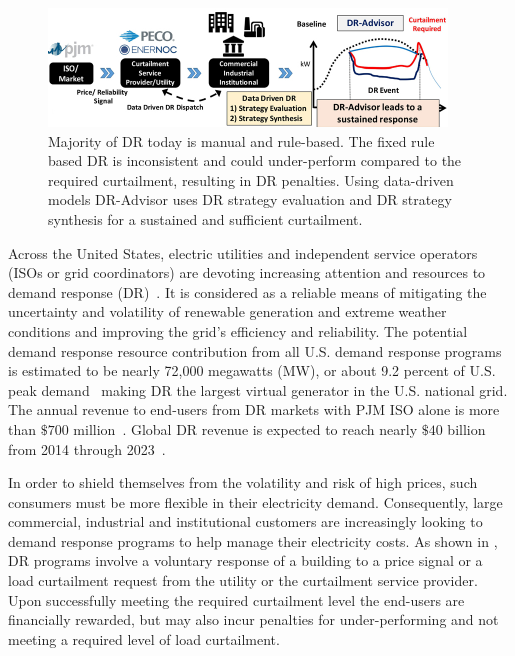\begin{figure}[t]
\centering
\includegraphics[width=0.9\columnwidth]{figs/demandresponse}
\caption{Majority of DR today is manual and rule-based. The fixed rule based DR is inconsistent and could under-perform compared to the required curtailment, resulting in DR penalties. Using data-driven models DR-Advisor uses DR strategy evaluation and DR strategy synthesis for a sustained and sufficient curtailment.}
\label{fig:demand_response}
\vspace{-10pt}
\end{figure}

Across the United States, electric utilities and independent service operators (ISOs or grid coordinators) are devoting increasing attention and resources to demand response (DR)~\cite{goldman2010coordination}. It is considered as a reliable means of mitigating the uncertainty and volatility of renewable generation and extreme weather conditions and improving the grid's efficiency and reliability.
The potential demand response resource contribution from all U.S. demand response programs is estimated to be nearly 72,000 megawatts (MW), or about 9.2 percent of U.S. peak demand~\cite{federal2008assessment} making DR the largest virtual generator in the U.S. national grid.
The annual revenue to end-users from DR markets with PJM ISO alone is more than $\$700$ million~\cite{pjm}. 
Global DR revenue is expected to reach nearly $\$40$ billion from 2014 through 2023~\cite{navigant}.


In order to shield themselves from the volatility and risk of high prices, such consumers must be more flexible in their electricity demand. 
Consequently, large commercial, industrial and institutional customers are increasingly looking to demand response programs to help manage their electricity costs.
As shown in , DR programs involve a voluntary response of a building to a price signal or a load curtailment request from the utility or the curtailment service provider. 
Upon successfully meeting the required curtailment level the end-users are financially rewarded, but may also incur penalties for under-performing and not meeting a required level of load curtailment.


